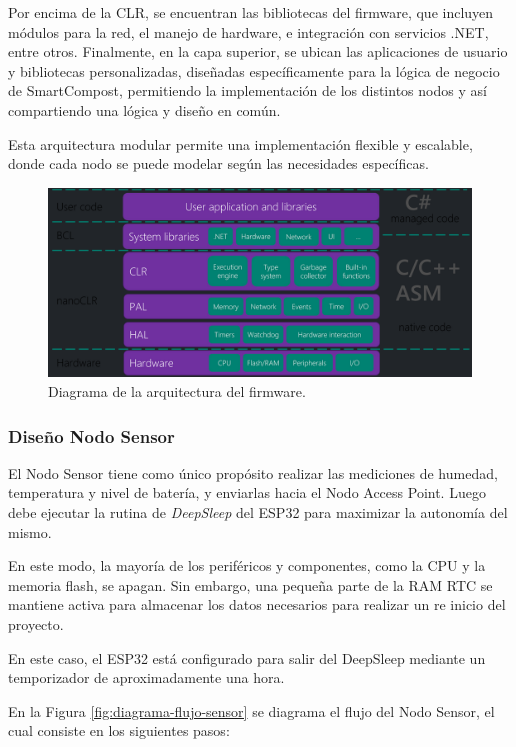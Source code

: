 Por encima de la CLR, se encuentran las bibliotecas del firmware, que incluyen módulos para la red, el manejo de hardware, e integración con servicios .NET, entre otros. Finalmente, en la capa superior, se ubican las aplicaciones de usuario y bibliotecas personalizadas, diseñadas específicamente para la lógica de negocio de SmartCompost, permitiendo la implementación de los distintos nodos y así compartiendo una lógica y diseño en común.

Esta arquitectura modular permite una implementación flexible y escalable, donde cada nodo se puede modelar según las necesidades específicas.

\begin{figure}[H]
    \centering
    \includegraphics[width=1\linewidth]{Figures/Firmware/nanoframework_arq.png}
    \caption{Diagrama de la arquitectura del firmware.}
    \label{fig:enter-label}
\end{figure}

\subsubsection{Diseño Nodo Sensor}


El Nodo Sensor tiene como único propósito realizar las mediciones de humedad, temperatura y nivel de batería, y enviarlas hacia el Nodo Access Point. Luego debe ejecutar la rutina de \textit{DeepSleep} del ESP32 para maximizar la autonomía del mismo.

En este modo, la mayoría de los periféricos y componentes, como la CPU y la memoria flash, se apagan. Sin embargo, una pequeña parte de la RAM RTC se mantiene activa para almacenar los datos necesarios para realizar un re inicio del proyecto.

En este caso, el ESP32 está configurado para salir del DeepSleep mediante un temporizador de aproximadamente una hora. 

En la Figura \ref{fig:diagrama-flujo-sensor} se diagrama el flujo del Nodo Sensor, el cual consiste en los siguientes pasos:

